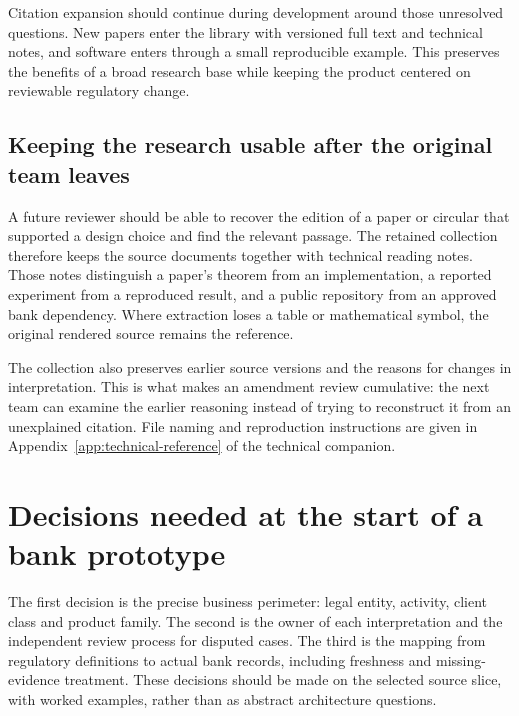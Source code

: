 
Citation expansion should continue during development around those unresolved
questions. New papers enter the library with versioned full text and technical
notes, and software enters through a small reproducible example. This preserves
the benefits of a broad research base while keeping the product centered on
reviewable regulatory change.

\subsection{Keeping the research usable after the original team leaves}

A future reviewer should be able to recover the edition of a paper or circular
that supported a design choice and find the relevant passage. The retained
collection therefore keeps the source documents together with technical reading
notes. Those notes distinguish a paper's theorem from an implementation, a
reported experiment from a reproduced result, and a public repository from an
approved bank dependency. Where extraction loses a table or mathematical symbol,
the original rendered source remains the reference.

The collection also preserves earlier source versions and the reasons for changes
in interpretation. This is what makes an amendment review cumulative: the next
team can examine the earlier reasoning instead of trying to reconstruct it from
an unexplained citation. File naming and reproduction instructions are given in
Appendix~\ref{app:technical-reference} of the technical companion.


\section{Decisions needed at the start of a bank prototype}
\label{merge:P-05-evidence:03}


The first decision is the precise business perimeter: legal entity, activity,
client class and product family. The second is the owner of each interpretation
and the independent review process for disputed cases. The third is the mapping
from regulatory definitions to actual bank records, including freshness and
missing-evidence treatment. These decisions should be made on the selected source
slice, with worked examples, rather than as abstract architecture questions.

